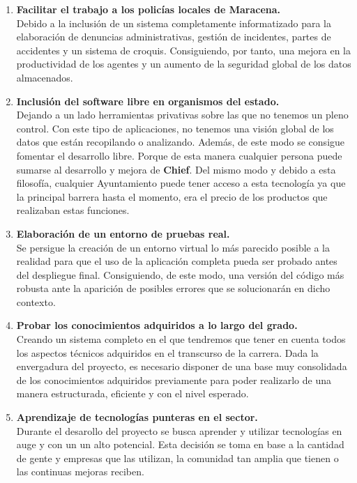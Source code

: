 \begin{enumerate}

    \item \textbf{Facilitar el trabajo a los policías locales de Maracena.}\\
    Debido a la inclusión de un sistema completamente informatizado para la elaboración de 
    denuncias administrativas, gestión de incidentes, partes de accidentes y un sistema de croquis. Consiguiendo,
    por tanto, una mejora en la productividad de los agentes y un aumento de la seguridad
    global de los datos almacenados.
    
    \item \textbf{Inclusión del software libre en organismos del estado.}\\
    Dejando a un lado herramientas privativas sobre las que no tenemos un pleno control. Con este tipo de aplicaciones, no tenemos una visión global
    de los datos que están recopilando o analizando. Además, de este modo se consigue fomentar el desarrollo libre. Porque 
    de esta manera cualquier persona puede sumarse al desarrollo y mejora de \textbf{Chief}. Del mismo modo y debido a esta filosofía, cualquier Ayuntamiento puede tener acceso a esta tecnología ya que la principal barrera hasta el momento, era el precio de los productos que realizaban estas funciones.

    \item \textbf{Elaboración de un entorno de pruebas real.}\\
    Se persigue la creación de un entorno virtual lo más parecido posible a la 
    realidad para que el uso de la aplicación completa pueda ser probado antes del despliegue 
    final. Consiguiendo, de este modo, una versión del código más robusta ante la aparición de posibles errores que se solucionarán en dicho contexto.
   	
    \item \textbf{Probar los conocimientos adquiridos a lo largo del grado.}\\
    Creando un sistema completo en el que tendremos que tener en cuenta todos los 
    aspectos técnicos adquiridos en el transcurso de la carrera. Dada la envergadura del
    proyecto, es necesario disponer de una base muy consolidada de los conocimientos adquiridos
    previamente para poder realizarlo de una manera estructurada, eficiente y con el nivel esperado.

    \item \textbf{Aprendizaje de tecnologías punteras en el sector.}\\
    Durante el desarollo del proyecto se busca aprender y utilizar tecnologías en 
    auge y con un un alto potencial. Esta decisión se toma en base  a la cantidad de gente
    y empresas que las utilizan, la comunidad tan amplia que tienen o las continuas
    mejoras reciben.

\end{enumerate}

